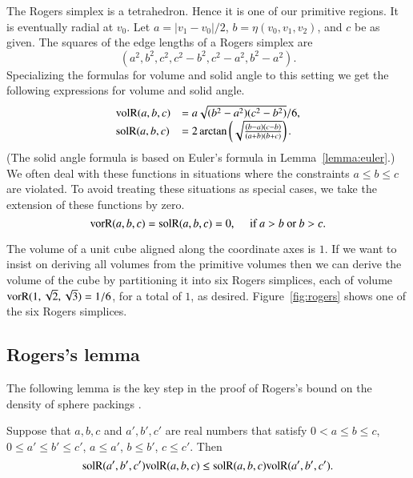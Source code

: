 The Rogers simplex is a tetrahedron.  Hence it is one of our
primitive regions.  It is eventually radial at $v_0$.
Let $a=|v_1-v_0|/2$, $b=\eta(v_0,v_1,v_2)$, and $c$ be as given.
The squares of the edge lengths of a Rogers simplex are
   $$
   (a^2,b^2,c^2,c^2-b^2,c^2-a^2,b^2-a^2).
   $$
Specializing the formulas for volume and solid angle to this
setting we get the following expressions for volume and solid angle.
   $$
   \begin{array}{lll}
     {\operatorname{volR}}(a,b,c) &= a\sqrt{(b^2-a^2)(c^2-b^2)}/6,\\
     {\operatorname{solR}}(a,b,c) &= 2 \arctan\left(\sqrt{\frac{(b-a) (c-b)}{(a+b)
   (b+c)}}\right).
     \end{array}
   $$
(The solid angle formula is based on Euler's formula in 
Lemma~\ref{lemma:euler}.)
We often deal with these functions in situations where the
constraints $a\le b\le c$ are violated.  To avoid treating these
situations as special cases, we take the extension of these functions
by zero.
   $$
   {\operatorname{vorR}}(a,b,c)={\operatorname{solR}}(a,b,c)=0,\quad 
   \text{ if } a>b\text{ or } b > c.
   $$

\begin{remark}
The volume of a unit cube aligned along the coordinate axes is $1$.  
If we want to insist on deriving all volumes from the primitive
volumes then we can derive the volume of the cube by partitioning
it into six Rogers simplices,
each of volume ${\operatorname{vorR}}(1,\sqrt2,\sqrt3) = 1/6$, for a total
of $1$, as desired.  Figure~\ref{fig:rogers} shows one of the six
Rogers simplices.
\end{remark}



\subsection{Rogers's lemma}


The following lemma is the key step in the proof of Rogers's
bound on the density of sphere packings \cite{Rog58}.

\begin{lemma} \label{lemma:rogers}
Suppose that $a,b,c$ and $a',b',c'$
are real numbers that satisfy $0 <a \le b \le c$, $0 \le a'\le b'\le c'$,
$a \le a'$, $b \le b'$, $c \le c'$. Then
  $$
  {\operatorname{solR}}(a',b',c'){\operatorname{volR}}(a,b,c) \le {\operatorname{solR}}(a,b,c){\operatorname{volR}}(a',b',c').
  $$
\end{lemma}

